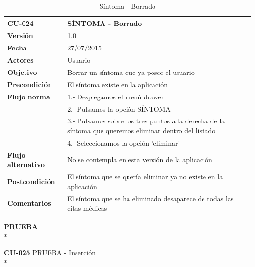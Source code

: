 \documentclass[../pfc.tex]{subfiles}
\begin{document}
	\begin{table}[H]
		\centering
		\begin{tabular}[t]{|p{3cm}|p{9.5cm}|}
			\hline \textbf{CU-024} & \textbf{SÍNTOMA - Borrado} \\*
			\hline\hline \textbf{Versión} & 1.0 \\*
			\hline\hline \textbf{Fecha} & 27/07/2015 \\*
			\hline\textbf{Actores} 	& Usuario\\*
			\hline \textbf{Objetivo} & Borrar un síntoma que ya posee el usuario\\* 			
			\hline \textbf{Precondición} & El síntoma existe en la aplicación\\* 
			\hline \textbf{Flujo normal} & 1.- Desplegamos el menú drawer \\* 
			& 2.- Pulsamos la opción SÍNTOMA\\*	
			& 3.- Pulsamos sobre los tres puntos a la derecha de la síntoma que queremos eliminar dentro del listado\\*	
			& 4.- Seleccionamos la opción 'eliminar'\\*	
			\hline \textbf{Flujo alternativo} & No se contempla en esta versión de la aplicación \\* 
			\hline \textbf{Postcondición} & El síntoma que se quería eliminar ya no existe en la aplicación \\* 
			\hline \textbf{Comentarios}   & El síntoma que se ha eliminado desaparece de todas las citas médicas\\*
			\hline
		\end{tabular}
		\caption{Síntoma - Borrado}
		\label{tabla:caso024}
	\end{table}
	
	\clearpage
	
	\textbf{PRUEBA}\\*
	
	\textbf{CU-025}	PRUEBA - Inserción\\*
	
\end{document}
